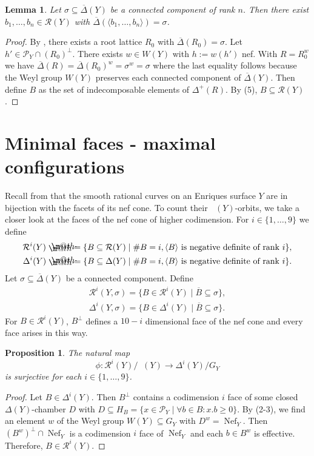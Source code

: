 \documentclass[a4paper]{amsart}
\makeatletter
\theoremstyle{definition}
\theoremstyle{plain}
\newtheorem{lemma}[definition]{Lemma}
\newtheorem{proposition}[definition]{Proposition}
\DeclareMathOperator{\Nef}{Nef}
\DeclareMathOperator{\aut}{Aut^*}
\renewcommand{\P}{\mathcal{P}}
\newcommand{\R}{\mathcal{R}}
\newcommand*{\defeq}{\mathrel{\rlap{
                     \raisebox{0.3ex}{$\m@th\cdot$}}
                     \raisebox{-0.3ex}{$\m@th\cdot$}}
                     =}
\newcommand{\DeltabarY}{\overline{\Delta}(Y)}
\makeatother
\begin{document}
\begin{lemma}\label{lem:BofTypeSigmaexists}
Let $\sigma \subseteq \DeltabarY$ be a connected component of rank $n$. 
Then there exist $b_1,\dots, b_n \in \R(Y)$ with $\overline{\Delta}(\langle b_1, \dots, b_n \rangle)=\sigma$.
\end{lemma}
\begin{proof}
By , there exists a root lattice $R_0$  with $\overline{\Delta}(R_0)=\sigma$.
Let $h' \in \P_Y \cap (R_0)^\perp$. There exists $w \in W(Y)$ with $h:=w(h')$ nef. With $R = R_0^w$ we have $\overline{\Delta}(R)=\overline{\Delta}(R_0)^w = \sigma^w=\sigma$ where the last equality follows because the Weyl group $W(Y)$ preserves each connected component of $\overline{\Delta}(Y)$.
Then define $B$ as the set of indecomposable elements of $\Delta^+(R)$. By  (5), $B \subseteq \R(Y)$.
\end{proof}


\section{Minimal faces - maximal configurations}
Recall from  that the smooth rational curves on an Enriques surface $Y$ are in bijection with the facets of its nef cone.
To count their $\aut(Y)$-orbits, we take a closer look at the faces of the nef cone of higher codimension.
For $i \in \{1,\dots, 9\}$ we define
\begin{eqnarray}
\R^i(Y)\defeq \{B \subseteq \R(Y) \mid  \# B =i, \langle B \rangle \mbox{ is negative definite of rank } i\},\\
\Delta^i(Y)\defeq \{B \subseteq \Delta(Y) \mid  \# B =i, \langle B \rangle \mbox{ is negative definite of rank } i\}.
\end{eqnarray}
Let $\sigma \subseteq \DeltabarY$ be a connected component.
Define
\begin{eqnarray}
\R^i(Y,\sigma) = \{B \in \R^i(Y) \mid \overline{B}\subseteq \sigma\},\\
\Delta^i(Y,\sigma) = \{B \in \Delta^i(Y) \mid \overline{B}\subseteq \sigma\}.
\end{eqnarray}
For $B \in \R^i(Y)$, $B^\perp$ defines a $10-i$ dimensional face of the nef cone and every face arises in this way.

\begin{proposition}\label{prop:rational_curves}
The natural map
\[\phi \colon \R^i(Y)/\aut(Y) \to \Delta^i(Y)/G_Y\] 
is surjective for each $i \in \{1,\dots,9\}$.
\end{proposition}
\begin{proof}
Let $B \in \Delta^i(Y)$. Then $B^\perp$ contains a codimension $i$ face of some closed $\Delta(Y)$-chamber $D$ with $D\subseteq H_B=\{x \in \P_Y \mid \forall b \in B: x.b\geq0\}$. By  (2-3), we find an element $w$ of the Weyl group $W(Y)\subseteq G_Y$ with $D^w = \Nef_Y$. Then $(B^w)^{\perp} \cap \Nef_Y$ is a codimension $i$ face of $\Nef_Y$ and each $b \in B^w$ is effective. Therefore, $B \in \R^i(Y)$.
\end{proof}
\end{document}
